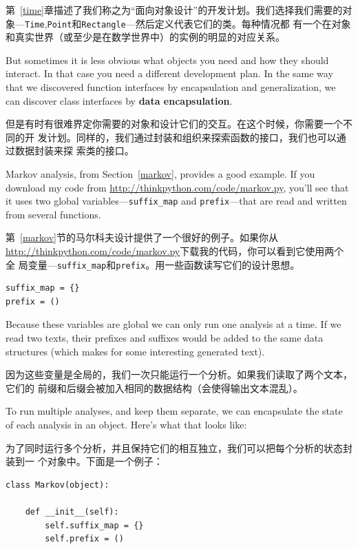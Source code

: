 \documentclass[10pt]{book}
\begin{document}
\begin{CJK}{UTF8}{gbsn}
第~\ref{time}章描述了我们称之为``面向对象设计''的开发计划。我们选择我们需要的对
象---{\tt Time},{\tt Point}和{\tt Rectangle}---然后定义代表它们的类。每种情况都
有一个在对象和真实世界（或至少是在数学世界中）的实例的明显的对应关系。

But sometimes it is less obvious what objects you need
and how they should interact.  In that case you need a different
development plan.  In the same way that we discovered function
interfaces by encapsulation and generalization, we can discover
class interfaces by {\bf data encapsulation}.

但是有时有很难界定你需要的对象和设计它们的交互。在这个时候，你需要一个不同的开
发计划。同样的，我们通过封装和组织来探索函数的接口，我们也可以通过数据封装来探
索类的接口。

Markov analysis, from Section~\ref{markov}, provides a good example.
If you download my code from \url{http://thinkpython.com/code/markov.py},
you'll see that it uses two global variables---\verb"suffix_map" and
\verb"prefix"---that are read and written from several functions.

第~\ref{markov}节的马尔科夫设计提供了一个很好的例子。如果你从
\url{http://thinkpython.com/code/markov.py}下载我的代码，你可以看到它使用两个全
局变量---\verb"suffix_map"和\verb"prefix"。用一些函数读写它们的设计思想。


\begin{verbatim}
suffix_map = {}        
prefix = ()            
\end{verbatim}

Because these variables are global
we can only run one analysis
at a time.  If we read two texts, their prefixes and suffixes would
be added to the same data structures (which makes for some interesting
generated text).

因为这些变量是全局的，我们一次只能运行一个分析。如果我们读取了两个文本，它们的
前缀和后缀会被加入相同的数据结构（会使得输出文本混乱）。

To run multiple analyses, and keep them separate, we can encapsulate
the state of each analysis in an object.
Here's what that looks like:

为了同时运行多个分析，并且保持它们的相互独立，我们可以把每个分析的状态封装到一
个对象中。下面是一个例子：

\begin{verbatim}
class Markov(object):

    def __init__(self):
        self.suffix_map = {}
        self.prefix = ()    
\end{verbatim}


\end{CJK}
\end{document}
